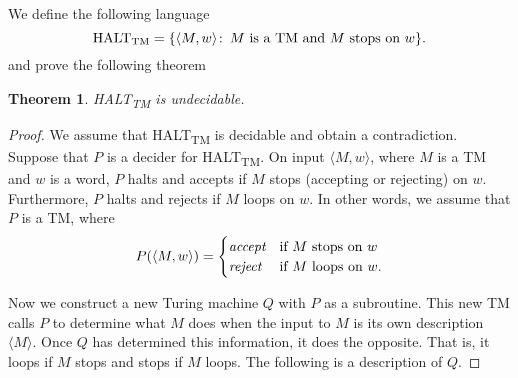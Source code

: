 \documentclass{article}
\newcommand{\theoremname}{Theorem}
\newtheorem{theorem}{\theoremname}
\newcommand{\st}{\colon\,}
\newcommand{\TM}{TM}
\newcommand{\HALTtm}{HALT\textsubscript{TM}}
\begin{document}
We define the following language
\begin{displaymath}
\text{\HALTtm{}} = \{ \langle M,w \rangle \st \text{\(M\) is a \TM{} and \(M\)
stops on \(w\)} \}.
\end{displaymath}
and prove the following theorem
\begin{theorem}\label{HALTtm}
\HALTtm{} is undecidable.
\end{theorem}
\begin{proof}
We assume that HALT\textsubscript{TM} is decidable and obtain a contradiction.
Suppose that \(P\) is a decider for \HALTtm{}.
On input \(\langle M, w \rangle\), where \(M\) is a \TM{} and \(w\) is a
word, \(P\) halts and accepts if \(M\) stops (accepting or rejecting) on \(w\).
Furthermore, \(P\) halts and rejects if
\(M\) loops on \(w\).
In other words, we assume that \(P\) is a \TM{}, where
\begin{displaymath}
P(\langle M, w\rangle) = \begin{cases}
	\emph{accept}&\text{if \(M\) stops on \(w\)}\\
	\emph{reject}&\text{if \(M\) loops on \(w\)}.
\end{cases}
\end{displaymath}

Now we construct a new Turing machine \(Q\) with \(P\) as a subroutine. This
new \TM{} calls \(P\) to determine what \(M\) does when the input to \(M\)
is its own
description \(\langle M \rangle\).
Once \(Q\) has determined this information, it does the opposite.
That is, it loops if \(M\) stops and stops if \(M\) loops.
The following is a description of \(Q\).


\end{proof}
\end{document}
